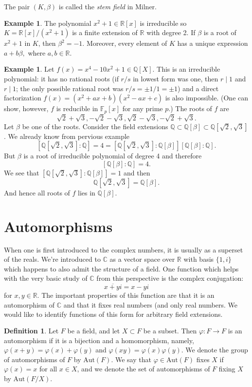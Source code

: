 \documentclass[12pt]{report}
\theoremstyle{definition}
\newtheorem{defn}[thm]{Definition}
\newtheorem{example}[thm]{Example}
\def\CC{\mathbb{C}}
\def\QQ{\mathbb{Q}}
\def\RR{\mathbb{R}}
\def\FF{\mathbb{F}}
\def\Aut{\mbox{Aut}}
\def\bb{\beta}
\begin{document}
\begin{remark}
    The pair $(K,\bb)$ is called the \emph{stem field} in Milner.
\end{remark}

\begin{example}
    The polynomial $x^2+1\in \RR[x]$ is irreducible so $K=\RR[x]/(x^2+1)$ is a finite extension of $\RR$ with degree 2. If $\bb$ is a root of $x^2+1$ in $K$, then $\bb^2=-1$. Moreover, every element of $K$ has a unique expression $a+b\bb,$ where $a,b\in \RR$.
\end{example}

\begin{example}
    Let $f(x)= x^4-10x^2+1\in \QQ[X]$. This is an irreducible polynomial: it has no rational roots (if $r/s$ in lowest form was one, then $r\mid 1$ and $r\mid 1$; the only possible rational root was $r/s =\pm 1/1=\pm 1$) and a direct factorization $f(x)=(x^2+ax+b)(x^2-ax+c)$ is also impossible. (One can show, however, $f$ is reducible in $\FF_p[x]$ for any prime $p$.) The roots of $f$ are $$\sqrt{2}+\sqrt{3}, -\sqrt{2}-\sqrt{3}, \sqrt{2}-\sqrt{3}, -\sqrt{2}+\sqrt{3}.$$
    Let $\bb$ be one of the roots. Consider the field extensions $\QQ\subset\QQ[\bb]\subset \QQ[\sqrt{2},\sqrt{3}]$. We already know from pervious example $$[\QQ[\sqrt{2},\sqrt{3}]:\QQ]=4=[\QQ[\sqrt{2},\sqrt{3}]:\QQ[\bb]][\QQ[\bb]:\QQ].$$ But $\bb$ is a root of irreducible polynomial of degree 4 and therefore $$[\QQ[\bb]:\QQ]=4.$$
    We see that $[\QQ[\sqrt{2},\sqrt{3}]:\QQ[\bb]]=1$ and then $$\QQ[\sqrt{2},\sqrt{3}]=\QQ[\bb].$$ 
    And hence all roots of $f$ lies in $\QQ[\bb]$.
\end{example}

\section{Automorphisms}
When one is first introduced to the complex numbers, it is usually as a superset of the reals. We're introduced to $\CC$ as a vector space over $\RR$ with basis $\{1,i\}$ which happens to also admit the structure of a field. One function which helps with the very basic study of $\CC$ from this perspective is the complex conjugation: $$\overline{x+yi}=x-yi$$ for $x,y\in \RR$. The important properties of this function are that it is an automorphism of $\CC$ and that it fixes real numbers (and only real numbers. We would like to identify functions of this form for arbitrary field extensions.

\begin{defn}
    Let $F$ be a field, and let $X \subset F$ be a subset. Then $\varphi: F \to F$ is an automorphism if it is a bijection and a homomorphism, namely, $\varphi(x+y)=\varphi(x)+\varphi(y)$ and $\varphi(xy)=\varphi(x)\varphi(y)$. We denote the group of automorphisms of $F$ by $\Aut(F)$. We say that $\varphi\in \Aut(F)$ fixes $X$ if $\varphi(x) = x$ for all $x \in X$, and we denote the set of automorphisms of $F$ fixing $X$ by $\Aut(F/X)$.
\end{defn}
\end{document}

